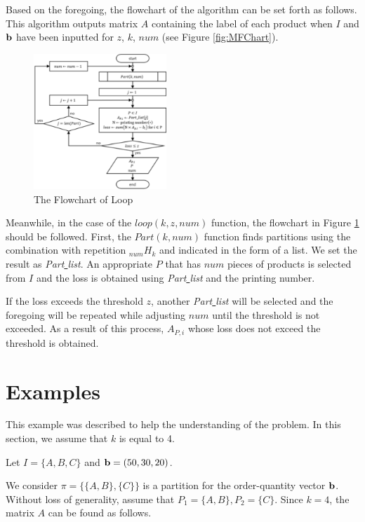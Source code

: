 \documentclass[review]{elsarticle}
\begin{document}
Based on the foregoing, the flowchart of the algorithm can be set forth as follows. 
This algorithm outputs matrix $A$ containing the label of each product when $I$ and ${\bf b}$ have been inputted for $z$, $k$, $num$ (see Figure \ref{fig:MFChart}). 

\begin{figure}[h!]
	\centering
	\includegraphics[width=5cm]{SubFChart.pdf}
	\caption{The Flowchart of Loop}
	\label{fig:SFChart}       %
\end{figure}

Meanwhile, in the case of the ${loop}(k, z, num)$ function, the flowchart in Figure \ref{fig:SFChart} should be followed.
First, the ${Part}(k, num)$ function finds partitions using the combination with repetition $_{num}H_{k}$ 
and indicated in the form of a list. 
We set the result as {\it Part\underline{ }list}. 
An appropriate $P$ that has $num$ pieces of products is selected from $I$ and the loss is obtained using {\it Part\underline{ }list} and the printing number.

If the loss exceeds the threshold $z$, another {\it Part\underline{ }list} will be selected and the foregoing will be repeated 
while adjusting $num$ until the threshold is not exceeded.
As a result of this process, $A_{P,i}$ whose loss does not exceed the threshold is obtained.%



\section{Examples}\label{sec:Exam}
This example was described to help the understanding of the problem. In this section, we assume that $k$ is equal to 4.

	Let $I=\{A,B,C\}$ and ${\bf b}=(50,30,20)$.
	
	We consider $\pi = \{\{A, B\}, \{C\}\}$ is a partition for the order-quantity vector ${\bf b}$. 
	Without loss of generality, assume that $P_{1} = \{A, B\}, P_{2} = \{C\}$. Since $k = 4$, the matrix $A$ can be found as follows.
	
\end{document}
